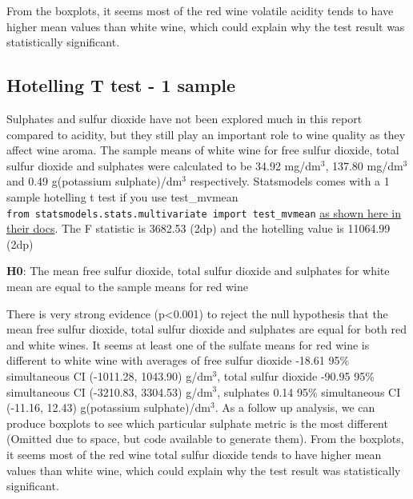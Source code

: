\documentclass[
]{article}
\begin{document}
From the boxplots, it seems most of the red wine volatile acidity tends
to have higher mean values than white wine, which could explain why the
test result was statistically significant.

\subsection{Hotelling T test - 1
sample}\label{hotelling-t-test---1-sample}

Sulphates and sulfur dioxide have not been explored much in this report
compared to acidity, but they still play an important role to wine
quality as they affect wine aroma. The sample means of white wine for
free sulfur dioxide, total sulfur dioxide and sulphates were calculated
to be 34.92 mg/dm\(^3\), 137.80 mg/dm\(^3\) and 0.49 g(potassium
sulphate)/dm\(^3\) respectively. Statsmodels comes with a 1 sample
hotelling t test if you use test\_mvmean
\texttt{from\ statsmodels.stats.multivariate\ import\ test\_mvmean}
\href{https://www.statsmodels.org/dev/generated/statsmodels.stats.multivariate.test_mvmean.html}{as
shown here in their docs}. The F statistic is 3682.53 (2dp) and the
hotelling value is 11064.99 (2dp)

\textbf{H0}: The mean free sulfur dioxide, total sulfur dioxide and
sulphates for white mean are equal to the sample means for red wine

There is very strong evidence (p\textless0.001) to reject the null
hypothesis that the mean free sulfur dioxide, total sulfur dioxide and
sulphates are equal for both red and white wines. It seems at least one
of the sulfate means for red wine is different to white wine with
averages of free sulfur dioxide -18.61 95\% simultaneous CI (-1011.28,
1043.90) g/dm\(^3\), total sulfur dioxide -90.95 95\% simultaneous CI
(-3210.83, 3304.53) g/dm\(^3\), sulphates 0.14 95\% simultaneous CI
(-11.16, 12.43) g(potassium sulphate)/dm\(^3\). As a follow up analysis,
we can produce boxplots to see which particular sulphate metric is the
most different (Omitted due to space, but code available to generate
them). From the boxplots, it seems most of the red wine total sulfur
dioxide tends to have higher mean values than white wine, which could
explain why the test result was statistically significant.

\printbibliography
\end{document}
